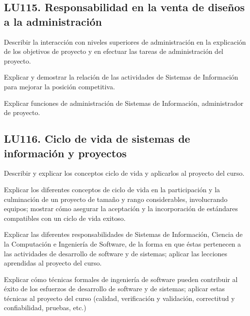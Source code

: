 \subsection{LU115. Responsabilidad en la venta de diseños a la administración}\label{sec:LU115}
\begin{LearningUnit}
\begin{LUGoal}
\item Describir la interacción con niveles superiores de administración en la explicación de los objetivos de proyecto y en efectuar las tareas de administración del proyecto.
\end{LUGoal}

\begin{LUObjective}
\item Explicar y demostrar la relación de las actividades de Sistemas de Información para mejorar la posición competitiva.
\item Explicar funciones de administración de Sistemas de Información, administrador de proyecto.
\end{LUObjective}
\end{LearningUnit}

\subsection{LU116. Ciclo de vida de sistemas de información y proyectos}\label{sec:LU116}
\begin{LearningUnit}
\begin{LUGoal}
\item Describir y explicar los conceptos ciclo de vida y aplicarlos al proyecto del curso.
\end{LUGoal}

\begin{LUObjective}
\item Explicar los diferentes conceptos de ciclo de vida en la participación y la culminación de un proyecto de tamaño y rango considerables, involucrando equipos; mostrar cómo asegurar la aceptación y la incorporación de estándares compatibles con un ciclo de vida exitoso.
\item Explicar las diferentes responsabilidades de Sistemas de Información, Ciencia de la Computación e Ingeniería de Software, de la forma en que éstas pertenecen a las actividades de desarrollo de software y de sistemas; aplicar las lecciones aprendidas al proyecto del curso.
\item Explicar cómo técnicas formales de ingeniería de software pueden contribuir al éxito de los esfuerzos de desarrollo de software y de sistemas; aplicar estas técnicas al proyecto del curso (calidad, verificación y validación, correctitud y confiabilidad, pruebas, etc.)
\end{LUObjective}
\end{LearningUnit}

